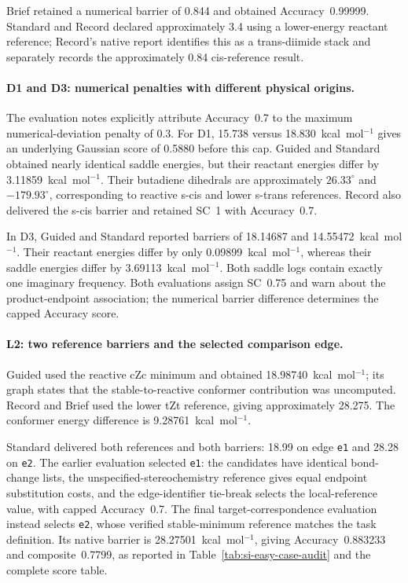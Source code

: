 Brief retained a numerical barrier of 0.844 and obtained Accuracy~0.99999. Standard and Record declared approximately 3.4 using a lower-energy reactant reference; Record's native report identifies this as a trans-diimide stack and separately records the approximately 0.84 cis-reference result.

\paragraph{D1 and D3: numerical penalties with different physical origins.}
The evaluation notes explicitly attribute Accuracy~0.7 to the maximum numerical-deviation penalty of 0.3. For D1, 15.738 versus 18.830~kcal~mol$^{-1}$ gives an underlying Gaussian score of 0.5880 before this cap. Guided and Standard obtained nearly identical saddle energies, but their reactant energies differ by 3.11859~kcal~mol$^{-1}$. Their butadiene dihedrals are approximately $26.33^\circ$ and $-179.93^\circ$, corresponding to reactive s-cis and lower s-trans references. Record also delivered the s-cis barrier and retained SC~1 with Accuracy~0.7.

In D3, Guided and Standard reported barriers of 18.14687 and 14.55472~kcal~mol$^{-1}$. Their reactant energies differ by only 0.09899~kcal~mol$^{-1}$, whereas their saddle energies differ by 3.69113~kcal~mol$^{-1}$. Both saddle logs contain exactly one imaginary frequency. Both evaluations assign SC~0.75 and warn about the product-endpoint association; the numerical barrier difference determines the capped Accuracy score.

\paragraph{L2: two reference barriers and the selected comparison edge.}
Guided used the reactive cZc minimum and obtained 18.98740~kcal~mol$^{-1}$; its graph states that the stable-to-reactive conformer contribution was uncomputed. Record and Brief used the lower tZt reference, giving approximately 28.275. The conformer energy difference is 9.28761~kcal~mol$^{-1}$.

Standard delivered both references and both barriers: 18.99 on edge \texttt{e1} and 28.28 on \texttt{e2}. The earlier evaluation selected \texttt{e1}: the candidates have identical bond-change lists, the unspecified-stereochemistry reference gives equal endpoint substitution costs, and the edge-identifier tie-break selects the local-reference value, with capped Accuracy~0.7. The final target-correspondence evaluation instead selects \texttt{e2}, whose verified stable-minimum reference matches the task definition. Its native barrier is 28.27501~kcal~mol$^{-1}$, giving Accuracy~0.883233 and composite~0.7799, as reported in Table~\ref{tab:si-easy-case-audit} and the complete score table.
